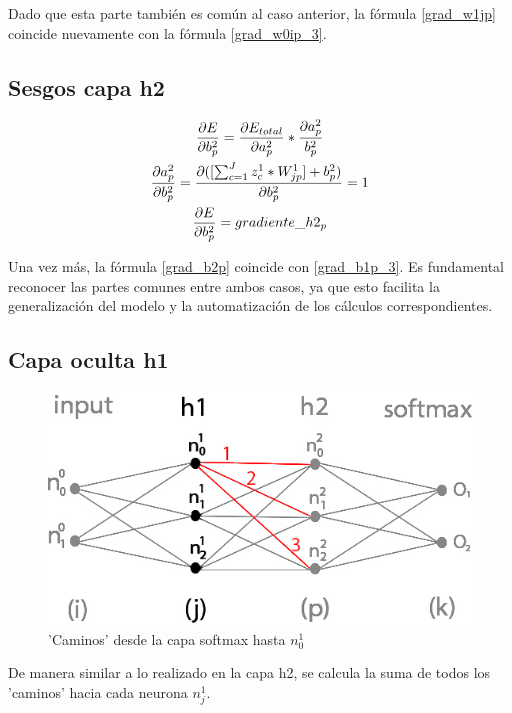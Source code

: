 Dado que esta parte también es común al caso anterior, la fórmula \ref{grad_w1jp} coincide nuevamente con la fórmula \ref{grad_w0ip_3}.


\subsection{Sesgos capa h2}

\begin{gather}
	\frac{\partial E}{\partial b^2_p} = \frac{\partial E_{total} }{\partial a^2_p } * \frac{\partial a^2_p}{b^2_p} \notag \\
	\frac{\partial a^2_p }{\partial b^2_p } = \frac{\partial ([\sum_{c=1}^{J} z^1_c * W^1_{jp}] + b^2_p) }{\partial b^2_p } = 1 \notag \\
	\frac{\partial E}{\partial b^2_p} = gradiente\_h2_p
	\label{grad_b2p}
\end{gather}

Una vez más, la fórmula \ref{grad_b2p} coincide con \ref{grad_b1p_3}. Es fundamental reconocer las partes comunes entre ambos casos, ya que esto facilita la generalización del modelo y la automatización de los cálculos correspondientes.

\subsection{Capa oculta h1}

\begin{figure}[H]
	\centering
	\includegraphics[scale=0.35]{imagenes/nn_h1_caminos_posibles.jpg}  
	\caption{'Caminos' desde la capa softmax hasta $n^1_0$}
	\label{nn_h1_caminos_posibles}
\end{figure}

De manera similar a lo realizado en la capa h2, se calcula la suma de todos los 'caminos' hacia cada neurona $n^1_j$. \\

